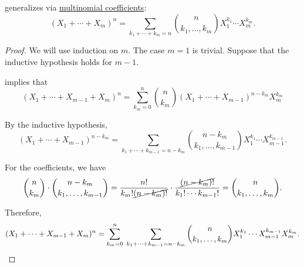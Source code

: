 \begin{theorem}\label{thm:multinomial_theorem}
   generalizes via \hyperref[def:multinomial_coefficient]{multinomial coefficients}:
  \begin{equation}\label{eq:thm:multinomial_theorem}
    (X_1 + \cdots + X_m)^n = \sum_{k_1 + \cdots + k_m = n} \binom n {k_1,\ldots,k_m} X_1^{k_1} \cdots X_m^{k_m}.
  \end{equation}
\end{theorem}
\begin{proof}
  We will use induction on \( m \). The case \( m = 1 \) is trivial. Suppose that the inductive hypothesis holds for \( m - 1 \).

   implies that
  \begin{equation*}
    (X_1 + \cdots + X_{m-1} + X_m)^n
    =
    \sum_{k_m=0}^n \binom n {k_m} (X_1 + \cdots + X_{m-1})^{n - k_m} X_m^{k_m}
  \end{equation*}

  By the inductive hypothesis,
  \begin{equation*}
    (X_1 + \cdots + X_{m-1})^{n - k_m}
    =
    \sum_{k_1 + \cdots + k_{m-1} = n - k_m} \binom {n - k_m} {k_1,\ldots,k_{m-1}} X_1^{k_1} \cdots X_{m-1}^{k_{m-1}}.
  \end{equation*}

  For the coefficients, we have
  \begin{equation*}
    \binom n {k_m} \cdot \binom {n - k_m} {k_1,\ldots,k_{m-1}}
    =
    \frac {n!} {k_m! \cancel{(n - k_m)!}} \cdot \frac {\cancel{(n - k_m)!}} {k_1! \cdots k_{m-1}!}
    =
    \binom n {k_1,\ldots,k_m}.
  \end{equation*}

  Therefore,
  \begin{equation*}
    (X_1 + \cdots + X_{m-1} + X_m)^n
    =
    \sum_{k_m=0}^n \thickspace \sum_{k_1 + \cdots + k_{m-1} = n - k_m} \binom n {k_1,\ldots,k_m} X_1^{k_1} \cdots X_{m-1}^{k_{m-1}} X_m^{k_m}.
  \end{equation*}
\end{proof}
